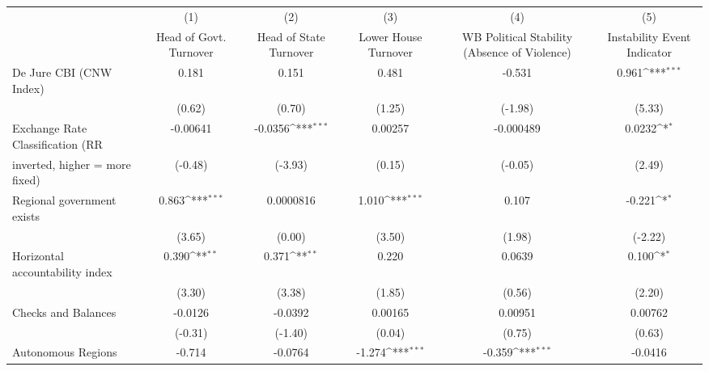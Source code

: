 {
\def\sym#1{\ifmmode^{#1}\else\(^{#1}\)\fi}
\begin{tabular}{l*{5}{c}}
\toprule
                                        &\multicolumn{1}{c}{(1)}&\multicolumn{1}{c}{(2)}&\multicolumn{1}{c}{(3)}&\multicolumn{1}{c}{(4)}&\multicolumn{1}{c}{(5)}\\
                                        &\multicolumn{1}{c}{Head of Govt. Turnover}&\multicolumn{1}{c}{Head of State Turnover}&\multicolumn{1}{c}{Lower House Turnover}&\multicolumn{1}{c}{WB Political Stability (Absence of Violence)}&\multicolumn{1}{c}{Instability Event Indicator}\\
\midrule
De Jure CBI (CNW Index)                 &    0.181         &    0.151         &    0.481         &   -0.531         &    0.961\sym{***}\\
                                        &   (0.62)         &   (0.70)         &   (1.25)         &  (-1.98)         &   (5.33)         \\
\addlinespace
Exchange Rate Classification (RR        & -0.00641         &  -0.0356\sym{***}&  0.00257         &-0.000489         &   0.0232\sym{*}  \\
inverted, higher = more fixed)          &  (-0.48)         &  (-3.93)         &   (0.15)         &  (-0.05)         &   (2.49)         \\
\addlinespace
Regional government exists              &    0.863\sym{***}&0.0000816         &    1.010\sym{***}&    0.107         &   -0.221\sym{*}  \\
                                        &   (3.65)         &   (0.00)         &   (3.50)         &   (1.98)         &  (-2.22)         \\
\addlinespace
Horizontal accountability index         &    0.390\sym{**} &    0.371\sym{**} &    0.220         &   0.0639         &    0.100\sym{*}  \\
                                        &   (3.30)         &   (3.38)         &   (1.85)         &   (0.56)         &   (2.20)         \\
\addlinespace
Checks and Balances                     &  -0.0126         &  -0.0392         &  0.00165         &  0.00951         &  0.00762         \\
                                        &  (-0.31)         &  (-1.40)         &   (0.04)         &   (0.75)         &   (0.63)         \\
\addlinespace
Autonomous Regions                      &   -0.714         &  -0.0764         &   -1.274\sym{***}&   -0.359\sym{***}&  -0.0416         \\

\end{tabular}}
